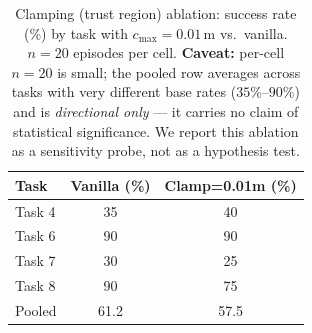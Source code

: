 \begin{table}[t]
\centering
\caption{Clamping (trust region) ablation: success rate (\%) by task with $c_{\max}=0.01$\,m vs.\ vanilla. $n=20$ episodes per cell. \textbf{Caveat:} per-cell $n{=}20$ is small; the pooled row averages across tasks with very different base rates ($35\%$--$90\%$) and is \emph{directional only} --- it carries no claim of statistical significance. We report this ablation as a sensitivity probe, not as a hypothesis test.}
\label{tab:clamping_ablation}
\begin{tabular}{lcc}
\toprule
Task & Vanilla (\%) & Clamp=0.01m (\%) \\
\midrule
Task 4 & 35 & 40 \\
Task 6 & 90 & 90 \\
Task 7 & 30 & 25 \\
Task 8 & 90 & 75 \\
\midrule
Pooled & 61.2 & 57.5 \\
\bottomrule
\end{tabular}
\end{table}
